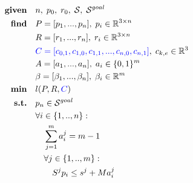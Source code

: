 \begin{align}
    \textrm{\textbf{given}} %
                            \quad & n, \; p_0, \; r_0, \; \mathcal{S}, \; \mathcal{S}^{goal} \nonumber\\
    \textrm{\textbf{find}}  \quad & P=[p_1,...,p_n], \; p_i \in \mathbb{R}^{3 \times n} \nonumber\\
                            \quad & R=[r_1,...,r_n], \; r_i \in \mathbb{R}^{3 \times n} \nonumber\\
                            \quad & \textcolor{blue}{C=[c_{0,1},c_{1,0},c_{1,1},...,c_{n,0},c_{n,1}]}, \; c_{k,e} \in \mathbb{R}^3 \nonumber\\
                            \quad & A=[a_1,...,a_n], \; a_i \in \{0,1\}^{m} \nonumber\\
                            \quad & \beta=[\beta_1,...,\beta_n], \; \beta_i \in \mathbb{R}^{m} \nonumber\\
    \textrm{\textbf{min}}  \quad & l(P,R,\textcolor{blue}{C}) \nonumber\\
    \textrm{\textbf{s.t.}}  \quad & p_n \in \mathcal{S}^{goal} \nonumber\\
                            \quad & \forall i \in \{1,..,n\} : \nonumber\\
                                \quad & \quad \sum_{j=1}^{m} a_i^j = m-1  \nonumber\\
                                \quad & \quad \forall j \in \{1,..,m\} : \nonumber\\
                                    \quad & \quad \quad S^j p_i \leq s^j + M a_i^j  \nonumber\\

\end{align}
